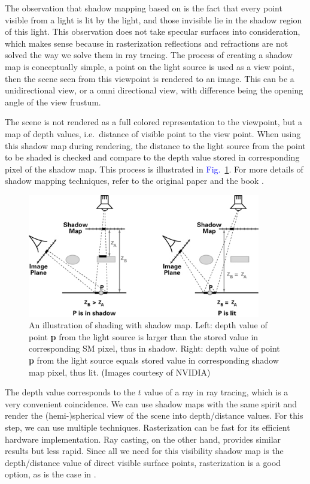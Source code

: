 \documentclass[]{book}
\renewcommand{\figurename}{\textcolor{blue}{Fig.\ }}
\begin{document}
The observation that shadow mapping based on is the fact that every point visible from a light is lit by the light, and those invisible lie in the shadow region of this light.
This observation does not take specular surfaces into consideration, which makes sense because in rasterization reflections and refractions are not solved the way we solve them in ray tracing.
The process of creating a shadow map is conceptually simple, a point on the light source is used as a view point, then the scene seen from this viewpoint is rendered to an image.
This can be a unidirectional view, or a omni directional view, with difference being the opening angle of the view frustum.

The scene is not rendered as a full colored representation to the viewpoint, but a map of depth values, i.e.\ distance of visible point to the view point.
When using this shadow map during rendering, the distance to the light source from the point to be shaded is checked and compare to the depth value stored in corresponding pixel of the shadow map.
This process is illustrated in \figurename \ref{fig:VC:shadowMaps}.
For more details of shadow mapping techniques, refer to the original paper \cite{williams1978SM} and the book  \cite{eisemann2011real}.

\begin{figure}
	\centering
	\includegraphics[width=4.0in]{img/VC-3-shadowMap.png}
	\caption[Shadow Mapping]{An illustration of shading with shadow map. Left: depth value of point \textbf{p} from the light source is larger than the stored value in corresponding SM pixel, thus in shadow. Right: depth value of point \textbf{p} from the light source equals stored value in corresponding shadow map pixel, thus lit. (Images courtesy of NVIDIA)}
	\label{fig:VC:shadowMaps}
\end{figure}

The depth value corresponds to the $t$ value of a ray in ray tracing, which is a very convenient coincidence.
We can use shadow maps with the same spirit and render the (hemi-)spherical view of the scene into depth/distance values.
For this step, we can use multiple techniques.
Rasterization can be fast for its efficient hardware implementation.
Ray casting, on the other hand, provides similar results but less rapid.
Since all we need for this visibility shadow map is the depth/distance value of direct visible surface points, rasterization is a good option, as is the case in \cite{ulbrich2013progressive}.
\end{document}
